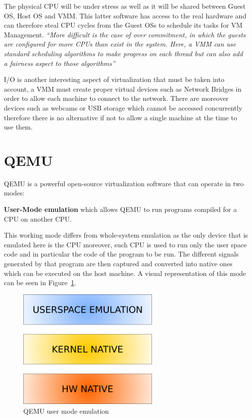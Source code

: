The physical CPU will be under stress as well as it will be shared between Guest OS, Host OS and VMM. This latter software has access to the real hardware and can therefore steal CPU cycles from the Guest OSs to schedule its tasks for VM Management.
\textit{``More difficult is the case of over commitment, in which the guests are configured for more CPUs than exist in the system. Here, a VMM can use standard scheduling algorithms to make progress on each thread but can also add a fairness aspect to those algorithms''}~\cite{os}

I/O is another interesting aspect of virtualization that must be taken into account, a VMM must create proper virtual devices such as Network Bridges in order to allow each machine to connect to the network. There are moreover devices such as webcams or USB storage which cannot be accessed concurrently therefore there is no alternative if not to allow a single machine at the time to use them.


\section{QEMU}

QEMU is a powerful open-source virtualization software that can operate in two modes: 

\textbf{User-Mode emulation} which allows QEMU to run programs compiled for a CPU on another CPU.

This working mode differs from whole-system emulation as the only device that is emulated here is the CPU moreover, such CPU is used to run only the user space code and in particular the code of the program to be run. The different signals generated by that program are then captured and converted into native ones which can be executed on the host machine. A visual representation of this mode can be seen in Figure~\ref{fig:quser}.

\begin{figure}[htp]
\centering
\includegraphics[width=7cm]{images/qemu-user.png}
\caption{QEMU user mode emulation~\cite{quser}}
\label{fig:quser}
\end{figure}

